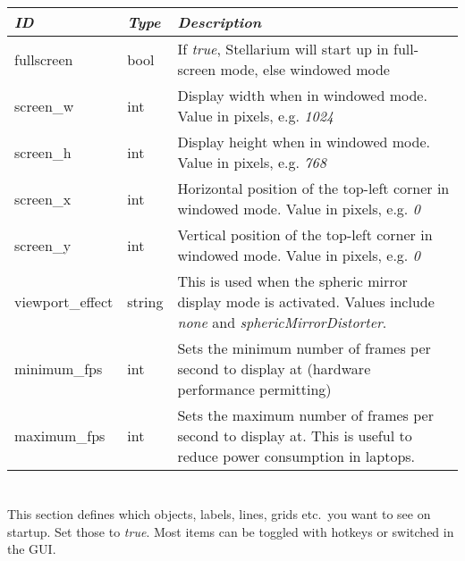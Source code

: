 \begin{longtabu} to \textwidth {l|l|X}\toprule
\emph{ID}  & \emph{Type} & \emph{Description}\\\midrule
fullscreen       & bool   & If \emph{true}, Stellarium will start up in full-screen mode, else windowed mode\\\midrule
screen\_w        & int    & Display width when in windowed mode. Value in pixels, e.g. \emph{1024}\\\midrule
screen\_h        & int    & Display height when in windowed mode. Value in pixels, e.g. \emph{768}\\\midrule
screen\_x        & int    & Horizontal position of the top-left corner in windowed mode. Value in pixels, e.g. \emph{0}\\\midrule
screen\_y        & int    & Vertical   position of the top-left corner in windowed mode. Value in pixels, e.g. \emph{0}\\\midrule
viewport\_effect & string & This is used when the spheric mirror display mode is activated. Values include \emph{none} and \emph{sphericMirrorDistorter}.\\\midrule
minimum\_fps     & int    & Sets the minimum number of frames per second to display at (hardware performance permitting)\\\midrule
maximum\_fps     & int    & Sets the maximum number of frames per second to display at. This is useful to reduce power consumption in laptops.\\\bottomrule
\end{longtabu}

\section{}\label{sec:config.ini:viewing}

This section defines which objects, labels, lines, grids etc.\ you
want to see on startup. Set those to \emph{true}. Most items can be
toggled with hotkeys or switched in the GUI.

